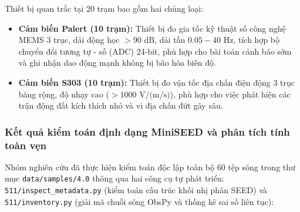\documentclass[preprint,1p]{elsarticle}
\begin{document}
Thiết bị quan trắc tại 20 trạm bao gồm hai chủng loại:
\begin{itemize}
    \item \textbf{Cảm biến Palert (10 trạm):} Thiết bị đo gia tốc kỹ thuật số công nghệ MEMS 3 trục, dải động học $> 90\text{ dB}$, dải tần $0.05 - 40\text{ Hz}$, tích hợp bộ chuyển đổi tương tự - số (ADC) 24-bit, phù hợp cho bài toán cảnh báo sớm và ghi nhận dao động mạnh không bị bão hòa biên độ.
    \item \textbf{Cảm biến S303 (10 trạm):} Thiết bị đo vận tốc địa chấn điện động 3 trục băng rộng, độ nhạy cao ($> 1000\text{ V/(m/s)}$), phù hợp cho việc phát hiện các trận động đất kích thích nhỏ và vi địa chấn đứt gãy sâu.
\end{itemize}

\subsubsection{Kết quả kiểm toán định dạng MiniSEED và phân tích tính toàn vẹn}
Nhóm nghiên cứu đã thực hiện kiểm toán độc lập toàn bộ 60 tệp sóng trong thư mục \texttt{data/samples/4.0} thông qua hai công cụ tự phát triển: \texttt{511/inspect\_metadata.py} (kiểm toán cấu trúc khối nhị phân SEED) và \texttt{511/inventory.py} (giải mã chuỗi sóng ObsPy và thống kê sai số liên tục):
\end{document}
